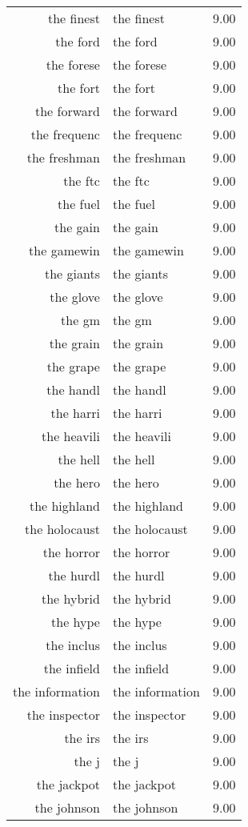 \begin{table}[ht]
\begin{tabular}{rlr}
  the finest & the finest & 9.00 \\ 
  the ford & the ford & 9.00 \\ 
  the forese & the forese & 9.00 \\ 
  the fort & the fort & 9.00 \\ 
  the forward & the forward & 9.00 \\ 
  the frequenc & the frequenc & 9.00 \\ 
  the freshman & the freshman & 9.00 \\ 
  the ftc & the ftc & 9.00 \\ 
  the fuel & the fuel & 9.00 \\ 
  the gain & the gain & 9.00 \\ 
  the gamewin & the gamewin & 9.00 \\ 
  the giants & the giants & 9.00 \\ 
  the glove & the glove & 9.00 \\ 
  the gm & the gm & 9.00 \\ 
  the grain & the grain & 9.00 \\ 
  the grape & the grape & 9.00 \\ 
  the handl & the handl & 9.00 \\ 
  the harri & the harri & 9.00 \\ 
  the heavili & the heavili & 9.00 \\ 
  the hell & the hell & 9.00 \\ 
  the hero & the hero & 9.00 \\ 
  the highland & the highland & 9.00 \\ 
  the holocaust & the holocaust & 9.00 \\ 
  the horror & the horror & 9.00 \\ 
  the hurdl & the hurdl & 9.00 \\ 
  the hybrid & the hybrid & 9.00 \\ 
  the hype & the hype & 9.00 \\ 
  the inclus & the inclus & 9.00 \\ 
  the infield & the infield & 9.00 \\ 
  the information & the information & 9.00 \\ 
  the inspector & the inspector & 9.00 \\ 
  the irs & the irs & 9.00 \\ 
  the j & the j & 9.00 \\ 
  the jackpot & the jackpot & 9.00 \\ 
  the johnson & the johnson & 9.00 \\ 

\end{tabular}
\end{table}
